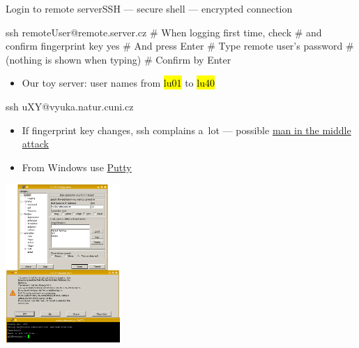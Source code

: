 \documentclass[compress, ucs, xelatex, 11pt, xcolor=svgnames,
  hyperref={
    bookmarks=true,
    unicode=true,
    colorlinks=true,
    pdftitle={Linux, command line and MetaCentrum},
    plainpages=false,
    pdfauthor={Vojtech Zeisek},
    pdfsubject={Course about use of Linux command line, writing shell scripts and using MetaCentrum of CESNET},
    pdfcreator={XeLaTeX},
    pdfkeywords={Linux, GNU, BASH, shell, command line, MetaCentrum},
    linkcolor=DarkRed,
    anchorcolor=DarkBlue,
    citecolor=Indigo,
    filecolor=NavyBlue,
    menucolor=DarkMagenta,
    urlcolor=DarkBlue,
    pdftex},
  url={hyphens, lowtilde} %
  ]{beamer}
\renewcommand{\texttt}[1]{\hl{\ttfamily #1}}
\begin{document}
\begin{frame}[fragile]{Login to remote server}{SSH --- secure shell --- encrypted connection}
  \label{ssh}
\begin{multicols}{2}
  \begin{bashcode}
    ssh remoteUser@remote.server.cz
    # When logging first time, check
    # and confirm fingerprint key
    yes # And press Enter
    # Type remote user's password
    # (nothing is shown when typing)
    # Confirm by Enter
  \end{bashcode}
  \begin{itemize}
    \item Our toy server: user names from \texttt{lu01} to \texttt{lu40}
  \end{itemize}
  \begin{bashcode}
    ssh uXY@vyuka.natur.cuni.cz
  \end{bashcode}
  \begin{itemize}
    \item If fingerprint key changes, ssh complains a~lot --- possible \href{https://en.wikipedia.org/wiki/Man-in-the-middle_attack}{man in the middle attack}
    \item From Windows use \href{https://www.putty.org/}{Putty}
  \end{itemize}
  \begin{center}
    \includegraphics[height=6cm]{putty.png}
  \end{center}
\end{multicols}
\end{frame}
\end{document}
